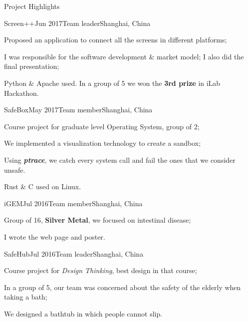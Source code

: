 \documentclass{resume} %
\begin{document}
\begin{rSection}{Project Highlights}

\begin{rSubsection}
  {Screen++}{Jun 2017}{Team leader}{Shanghai, China}
    \item Proposed an application to connect all the screens in different platforms;
    \item I was responsible for the software development \& market model; I also did the final presentation;
    \item Python \& Apache used. In a group of 5 we won the \textbf{3rd prize} in iLab Hackathon.
\end{rSubsection}


\begin{rSubsection}
  {SafeBox}{May 2017}{Team member}{Shanghai, China}
    \item Course project for graduate level Operating System, group of 2;
    \item We implemented a visualization technology to create a sandbox;
    \item Using \textit{\textbf{ptrace}}, we catch every system call and fail the ones that we consider unsafe.
    \item Rust \& C used on Linux.
\end{rSubsection}


\begin{rSubsection}
  {iGEM}{Jul 2016}{Team member}{Shanghai, China}
    \item Group of 16, \textbf{Silver Metal}, we focused on intestinal disease;
    \item I wrote the web page and poster.
\end{rSubsection}


\begin{rSubsection}
  {SafeHub}{Jul 2016}{Team leader}{Shanghai, China}
    \item Course project for \textit{Design Thinking}, best design in that course;
    \item In a group of 5, our team was concerned about the safety of the elderly when taking a bath;
    \item We designed a bathtub in which people cannot slip.
\end{rSubsection}
\end{rSection}
\end{document}
